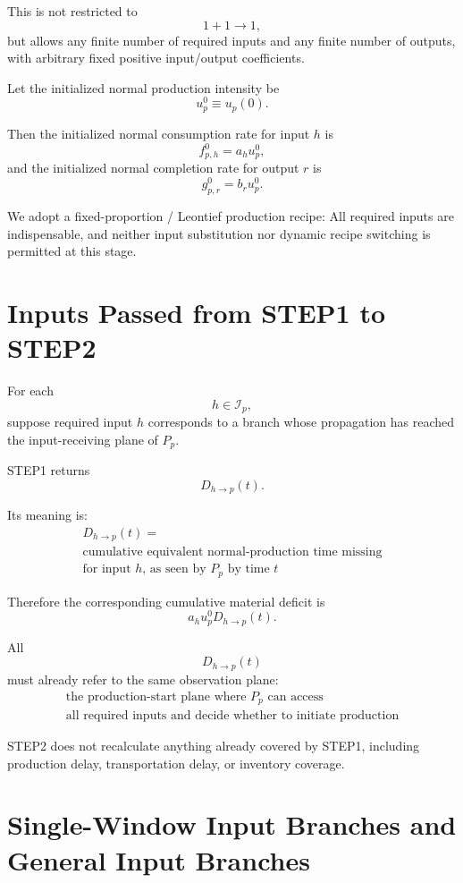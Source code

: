 \documentclass[11pt]{article}
\begin{document}
This is not restricted to
\[
1+1\to1,
\]
but allows any finite number of required inputs and any finite number of outputs,
with arbitrary fixed positive input/output coefficients.

Let the initialized normal production intensity be
\[
\boxed{
u_p^0\equiv u_p(0).
}
\]

Then the initialized normal consumption rate for input \(h\) is
\[
\boxed{
f_{p,h}^0=a_hu_p^0,
}
\tag{3}
\]
and the initialized normal completion rate for output \(r\) is
\[
\boxed{
g_{p,r}^0=b_ru_p^0.
}
\tag{4}
\]

We adopt a fixed-proportion / Leontief production recipe:
All required inputs are indispensable,
and neither input substitution nor dynamic recipe switching is permitted at this stage.

\section{Inputs Passed from STEP1 to STEP2}

For each
\[
h\in\mathcal I_p,
\]
suppose required input \(h\) corresponds to a branch whose propagation has reached the input-receiving plane of \(P_p\).

STEP1 returns
\[
\boxed{
D_{h\to p}(t).
}
\tag{5}
\]

Its meaning is:
\[
\boxed{\begin{gathered}
D_{h\to p}(t)=\\
\text{cumulative equivalent normal-production time missing}\\
\text{for input \(h\), as seen by \(P_p\) by time \(t\)}
\end{gathered}}
\]

Therefore the corresponding cumulative material deficit is
\[
\boxed{
a_hu_p^0D_{h\to p}(t).
}
\tag{6}
\]

All
\[
D_{h\to p}(t)
\]
must already refer to the same observation plane:
\[
\boxed{\begin{gathered}
\text{the production-start plane where \(P_p\) can access}\\
\text{all required inputs and decide whether to initiate production}
\end{gathered}}
\]

STEP2 does not recalculate anything already covered by STEP1,
including production delay, transportation delay, or inventory coverage.

\section{Single-Window Input Branches and General Input Branches}
\end{document}
